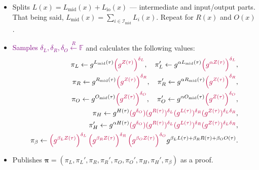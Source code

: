 \documentclass[../lecture-notes.tex]{subfiles}
\begin{document}
\begin{tcolorbox}
\begin{itemize}[label=]
        \item Splits $L(x) = L_{\text{mid}}(x) + L_{\text{io}}(x)$ --- intermediate and input/output parts. That being said, $L_{\text{mid}}(x) = \sum_{i \in \mathcal{I}_{\text{mid}}}L_i(x)$. Repeat for $R(x)$ and $O(x)$.
        \item \textcolor{purple}{Samples $\delta_L, \delta_R, \delta_O \xleftarrow{R} \mathbb{F}$} and calculates the following values: 
        \begin{align*}
            \pi_L \gets g^{L_{\text{mid}}(\tau)}\textcolor{purple}{\left(g^{Z(\tau)}\right)^{\delta_L}}, \quad \pi_L' \gets g^{\alpha L_{\text{mid}}(\tau)}\textcolor{purple}{\left(g^{\alpha Z(\tau)}\right)^{\delta_L}}, \\
            \pi_R \gets g^{R_{\text{mid}}(\tau)}\textcolor{purple}{\left(g^{Z(\tau)}\right)^{\delta_R}}, \quad \pi_R' \gets g^{\alpha R_{\text{mid}}(\tau)}\textcolor{purple}{\left(g^{Z(\tau)}\right)^{\delta_R}}, \\
            \pi_O \gets g^{O_{\text{mid}}(\tau)}\textcolor{purple}{\left(g^{Z(\tau)}\right)^{\delta_O}}, \quad \pi_O' \gets g^{\alpha O_{\text{mid}}(\tau)}\textcolor{purple}{\left(g^{Z(\tau)}\right)^{\delta_O}}, \\
            \pi_H \gets g^{H(\tau)}\textcolor{purple}{(g^{\delta_O})(g^{R(\tau)})^{\delta_L}(g^{L(\tau)})^{\delta_R}(g^{Z(\tau)})^{\delta_L\delta_R}}, \\ 
            \pi_H' \gets g^{\alpha H(\tau)}\textcolor{purple}{(g^{\delta_O})(g^{R(\tau)})^{\delta_L}(g^{L(\tau)})^{\delta_R}(g^{Z(\tau)})^{\delta_L\delta_R}}, \\
            \pi_{\beta} \gets \textcolor{purple}{\left(g^{\beta_L Z(\tau)}\right)^{\delta_L}\left(g^{\beta_R Z(\tau)}\right)^{\delta_R}\left(g^{\beta_O Z(\tau)}\right)^{\delta_O}}g^{\beta_LL(\tau) + \beta_RR(\tau) + \beta_OO(\tau)}.
        \end{align*}
        \item Publishes $\boldsymbol{\pi} = (\pi_L,\pi_L',\pi_R,\pi_R',\pi_O,\pi_O',\pi_H,\pi_H',\pi_{\beta})$ as a proof.
    \end{itemize}


\end{tcolorbox}
\end{document}
